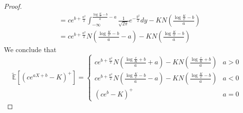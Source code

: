 \documentclass[a4paper, 10pt]{article}
\theoremstyle{definition}
\theoremstyle{hSol}
\begin{document}
\begin{proof}
\begin{equation}
\begin{split}
    &= ce^{b+\frac{a^2}{2}}\int_{-\infty}^{\frac{\log\frac{K}{c} - b}{a}-a} \frac{1}{\sqrt{2\pi}}e^{-\frac{y^2}{2}}dy - KN\left(\frac{\log\frac{K}{c} - b}{a}\right)\\
    &= ce^{b+\frac{a^2}{2}}N\left(\frac{\log\frac{K}{c} - b}{a} - a\right)- KN\left(\frac{\log\frac{K}{c} - b}{a}\right)
  \end{split}
\end{equation}
We conclude that
\begin{equation}
  \widetilde{\mathbb{E}}\left[(ce^{aX+b}-K)^+\right] = \begin{cases}
  ce^{b+\frac{a^2}{2}}N\left(\frac{\log\frac{c}{K} + b}{a} + a\right)- KN\left(\frac{\log\frac{c}{K} + b}{a}\right) & a > 0\\
  ce^{b+\frac{a^2}{2}}N\left(\frac{\log\frac{K}{c} - b}{a} - a\right)- KN\left(\frac{\log\frac{K}{c} - b}{a}\right) & a <0 \\
  (ce^b - K)^+ & a =0
  \end{cases}
\end{equation}
\end{proof}
\end{document}
